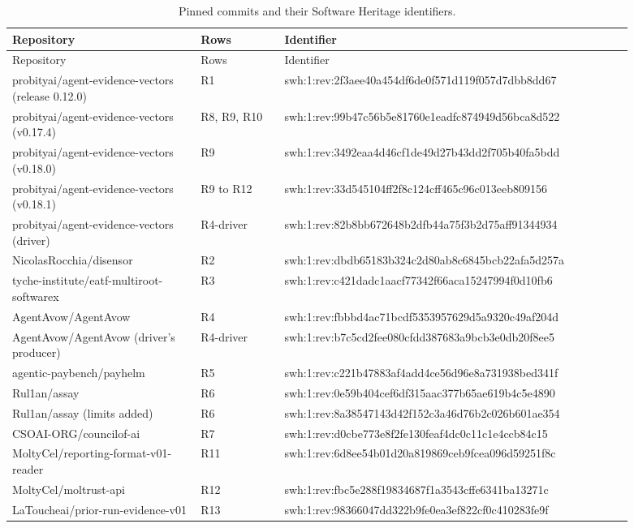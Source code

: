 {\footnotesize
\begin{longtable}{@{}>{\raggedright\arraybackslash}p{0.27\linewidth}>{\raggedright\arraybackslash}p{0.12\linewidth}>{\raggedright\arraybackslash}p{0.5\linewidth}@{}}
\caption{Pinned commits and their Software Heritage identifiers.}\label{tab:w3c-swhids}\\
\toprule
Repository & Rows & Identifier \\
\midrule
\endfirsthead
\toprule
Repository & Rows & Identifier \\
\midrule
\endhead
probityai/agent-evidence-vectors (release 0.12.0) & R1 & swh:1:rev:2f3aee40a454df6de0f571d119f057d7dbb8dd67 \\
probityai/agent-evidence-vectors (v0.17.4) & R8, R9, R10 & swh:1:rev:99b47c56b5e81760e1eadfc874949d56bca8d522 \\
probityai/agent-evidence-vectors (v0.18.0) & R9 & swh:1:rev:3492eaa4d46cf1de49d27b43dd2f705b40fa5bdd \\
probityai/agent-evidence-vectors (v0.18.1) & R9 to R12 & swh:1:rev:33d545104ff2f8c124cff465c96c013eeb809156 \\
probityai/agent-evidence-vectors (driver) & R4-driver & swh:1:rev:82b8bb672648b2dfb44a75f3b2d75aff91344934 \\
NicolasRocchia/disensor & R2 & swh:1:rev:dbdb65183b324c2d80ab8c6845bcb22afa5d257a \\
tyche-institute/eatf-multiroot-softwarex & R3 & swh:1:rev:c421dadc1aacf77342f66aca15247994f0d10fb6 \\
AgentAvow/AgentAvow & R4 & swh:1:rev:fbbbd4ac71bcdf5353957629d5a9320c49af204d \\
AgentAvow/AgentAvow (driver's producer) & R4-driver & swh:1:rev:b7c5cd2fee080cfdd387683a9bcb3e0db20f8ee5 \\
agentic-paybench/payhelm & R5 & swh:1:rev:c221b47883af4add4ce56d96e8a731938bed341f \\
Rul1an/assay & R6 & swh:1:rev:0e59b404cef6df315aac377b65ae619b4c5e4890 \\
Rul1an/assay (limits added) & R6 & swh:1:rev:8a38547143d42f152c3a46d76b2c026b601ae354 \\
CSOAI-ORG/councilof-ai & R7 & swh:1:rev:d0cbe773e8f2fe130feaf4dc0c11c1e4ccb84c15 \\
MoltyCel/reporting-format-v01-reader & R11 & swh:1:rev:6d8ee54b01d20a819869ceb9fcea096d59251f8c \\
MoltyCel/moltrust-api & R12 & swh:1:rev:fbc5e288f19834687f1a3543cffe6341ba13271c \\
LaToucheai/prior-run-evidence-v01 & R13 & swh:1:rev:98366047dd322b9fe0ea3ef822cf0c410283fe9f \\
\bottomrule
\end{longtable}
}


